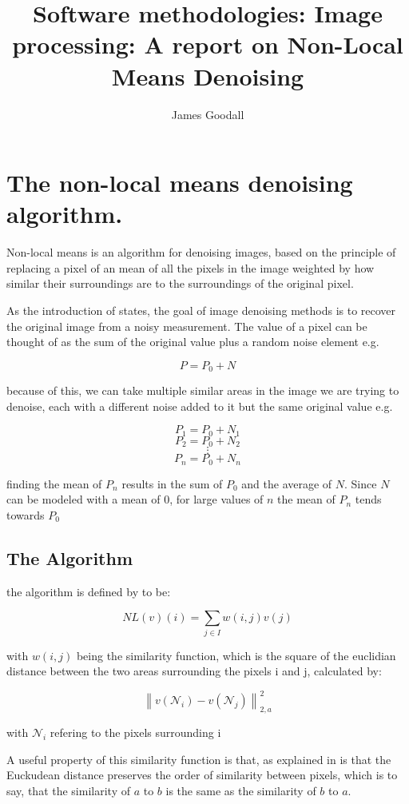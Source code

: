 \documentclass[11pt]{article}
\title{Software methodologies: Image processing: A report on Non-Local Means Denoising}
\author{James Goodall}
\begin{document}
\maketitle
\section{The non-local means denoising algorithm.}

Non-local means is an algorithm for denoising images, based on the principle of replacing a pixel of an mean of all the pixels in the image weighted by how similar their surroundings are to the surroundings of the original pixel. 

As the introduction of \cite{Buades} states, the goal of image denoising methods is to recover the original image from a noisy measurement. The value of a pixel can be thought of as the sum of the original value plus a random noise element e.g.

\[P = P_0 + N\]

because of this, we can take multiple similar areas in the image we are trying to denoise, each with a different noise added to it but the same original value e.g.

\[P_1 = P_0 + N_1\]
\[P_2 = P_0 + N_2\]
\[\vdots\]
\[P_n = P_0 + N_n\]

finding the mean of $P_n$ results in the sum of $P_0$ and the average of $N$. Since $N$ can be modeled with a mean of $0$, for large values of $n$ the mean of $P_n$ tends towards $P_0$

\subsection{The Algorithm} \label{algorithm}

the algorithm is defined by \cite{Buades_2005} to be: 

\[NL(v)(i) = \sum_{j \in I}{w(i,j)v(j)}\]

with $w(i,j)$ being the similarity function, which is the square of the euclidian distance between the two areas surrounding the pixels i and j, calculated by:

\[\left\|v\left(\mathcal{N}_{i}\right)-v\left(\mathcal{N}_{j}\right)\right\|_{2, a}^{2}\]

with $\mathcal{N}_i$ refering to the pixels surrounding i

A useful property of this similarity function is that, as explained in \cite{Buades_2005} is that the Euckudean distance preserves the order of similarity between pixels, which is to say, that the similarity of $a$ to $b$ is the same as the similarity of $b$ to $a$.
\end{document}
